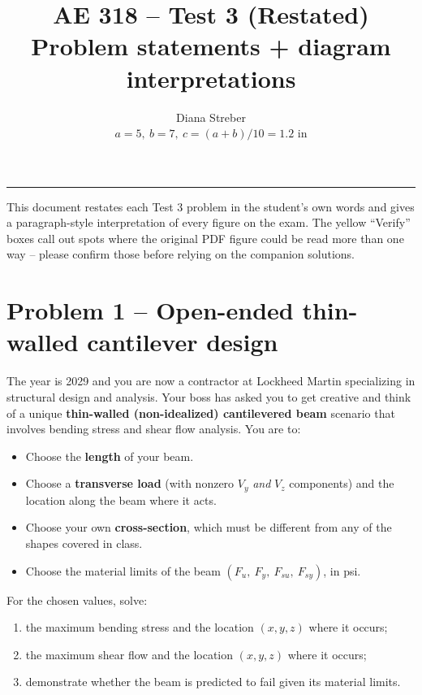\documentclass[11pt]{article}
\title{\textbf{AE 318 -- Test 3 (Restated)}\\\large Problem statements + diagram interpretations}
\author{Diana Streber\\\small $a = 5,\ b = 7,\ c = (a+b)/10 = 1.2$ in}
\date{}
\begin{document}
\maketitle
\hrule
\vspace{6pt}

This document restates each Test 3 problem in the student's own words and gives a paragraph-style interpretation of every figure on the exam. The yellow ``Verify'' boxes call out spots where the original PDF figure could be read more than one way -- please confirm those before relying on the companion solutions.

\section*{Problem 1 -- Open-ended thin-walled cantilever design}

\begin{problembox}
The year is 2029 and you are now a contractor at Lockheed Martin specializing in structural design and analysis. Your boss has asked you to get creative and think of a unique \textbf{thin-walled (non-idealized) cantilevered beam} scenario that involves bending stress and shear flow analysis. You are to:
\begin{itemize}[leftmargin=2em, itemsep=2pt]
  \item Choose the \textbf{length} of your beam.
  \item Choose a \textbf{transverse load} (with nonzero $V_y$ \emph{and} $V_z$ components) and the location along the beam where it acts.
  \item Choose your own \textbf{cross-section}, which must be different from any of the shapes covered in class.
  \item Choose the material limits of the beam $(F_u,\ F_y,\ F_{su},\ F_{sy})$, in psi.
\end{itemize}
For the chosen values, solve:
\begin{enumerate}[label=(\alph*), leftmargin=2em, itemsep=2pt]
  \item the maximum bending stress and the location $(x, y, z)$ where it occurs;
  \item the maximum shear flow and the location $(x, y, z)$ where it occurs;
  \item demonstrate whether the beam is predicted to fail given its material limits.
\end{enumerate}
\end{problembox}
\end{document}
